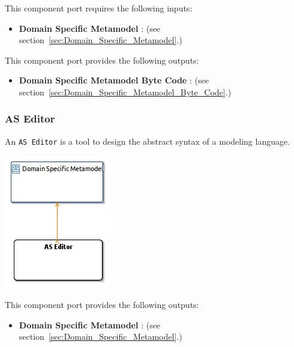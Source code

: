 \documentclass{gemoc} %
\begin{document}
This component port requires the following inputs:
\begin{itemize}
  \item \textbf{Domain Specific Metamodel} :
(see section~\ref{sec:Domain_Specific_Metamodel}.)
\end{itemize}

This component port provides the following outputs:
\begin{itemize}
  \item \textbf{Domain Specific Metamodel Byte Code} :
(see section~\ref{sec:Domain_Specific_Metamodel_Byte_Code}.)
\end{itemize}


\subsubsection{AS Editor}
\label{sec:AS_Editor}

An \texttt{AS Editor} is a tool to design the abstract syntax of a modeling language.
\begin{center}
\includegraphics*[trim=0.0cm 0.0cm 0cm 0.0cm, clip=true]{../images/generated/Generated_AS_Editor.png}
\end{center}


This component port provides the following outputs:
\begin{itemize}
  \item \textbf{Domain Specific Metamodel} :
(see section~\ref{sec:Domain_Specific_Metamodel}.)
\end{itemize}
\end{document}
